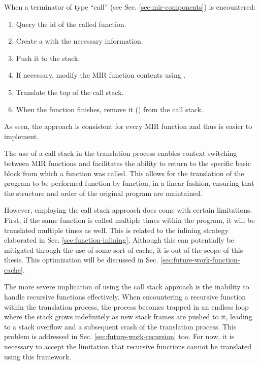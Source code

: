 When a terminator of type ``call'' (see Sec. \ref{sec:mir-components}) is encountered:

\begin{enumerate}
    \item Query the id of the called function.
    \item Create a  with the necessary information.
    \item Push it to the stack.
    \item If necessary, modify the \acrshort{MIR} function contents using .
    \item Translate the top of the call stack.
    \item When the function finishes, remove it () from the call stack.
\end{enumerate}

As seen, the approach is consistent for every \acrshort{MIR} function
and thus is easier to implement.

The use of a call stack in the translation process enables context switching
between \acrshort{MIR} functions and facilitates the ability to return to the specific basic block
from which a function was called.
This allows for the translation of the program to be performed function by function,
in a linear fashion, ensuring that the structure and order of the original program are maintained.

However, employing the call stack approach does come with certain limitations.
First, if the same function is called multiple times within the program,
it will be translated multiple times as well.
This is related to the inlining strategy elaborated in Sec. \ref{sec:function-inlining}.
Although this can potentially be mitigated through the use of some sort of cache,
it is out of the scope of this thesis.
This optimization will be discussed in Sec. \ref{sec:future-work-function-cache}.

The more severe implication of using the call stack approach
is the inability to handle recursive functions effectively.
When encountering a recursive function within the translation process,
the process becomes trapped in an endless loop
where the stack grows indefinitely as new stack frames are pushed to it,
leading to a stack overflow and a subsequent crash of the translation process.
This problem is addressed in Sec. \ref{sec:future-work-recursion} too.
For now, it is necessary to accept the limitation that recursive functions
cannot be translated using this framework.

